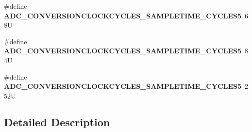\begin{DoxyCompactItemize}
\#define {\bfseries A\+D\+C\+\_\+\+C\+O\+N\+V\+E\+R\+S\+I\+O\+N\+C\+L\+O\+C\+K\+C\+Y\+C\+L\+E\+S\+\_\+\+S\+A\+M\+P\+L\+E\+T\+I\+M\+E\+\_\+C\+Y\+C\+L\+E\+S5}~68U
\item 
\mbox{\label{group___a_d_c__conversion__cycles_ga4d77fdfe1abfac5d2614dff6ae205513}} 
\#define {\bfseries A\+D\+C\+\_\+\+C\+O\+N\+V\+E\+R\+S\+I\+O\+N\+C\+L\+O\+C\+K\+C\+Y\+C\+L\+E\+S\+\_\+\+S\+A\+M\+P\+L\+E\+T\+I\+M\+E\+\_\+C\+Y\+C\+L\+E\+S5}~84U
\item 
\mbox{\label{group___a_d_c__conversion__cycles_gae0f9947c74b398f5c40bc4dd7da1ba97}} 
\#define {\bfseries A\+D\+C\+\_\+\+C\+O\+N\+V\+E\+R\+S\+I\+O\+N\+C\+L\+O\+C\+K\+C\+Y\+C\+L\+E\+S\+\_\+\+S\+A\+M\+P\+L\+E\+T\+I\+M\+E\+\_\+C\+Y\+C\+L\+E\+S5}~252U
\end{DoxyCompactItemize}


\subsection{Detailed Description}
